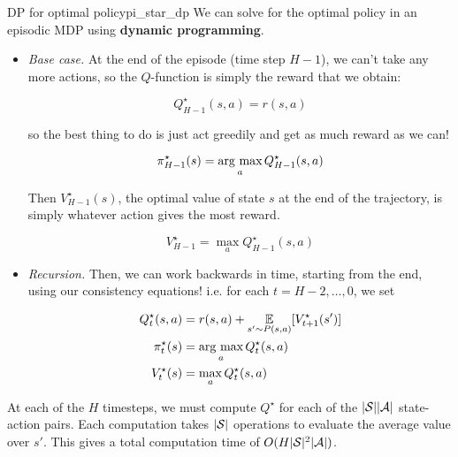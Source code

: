 \documentclass[../main/main]{subfiles}
\begin{document}
\begin{definition}{DP for optimal policy}{pi_star_dp}
    We can solve for the optimal policy in an episodic MDP using \textbf{dynamic programming}.
    
    \begin{itemize}
    \item \emph{Base case.} At the end of the episode (time step $H-1$),
        we can't take any more actions, so the $Q$-function is simply the reward
        that we obtain:
    
        \[
            Q^\star_{H-1}(s, a) = r(s, a)
        \]
    
        so the best thing to do is just act greedily
        and get as much reward as we can!
    
        \[
            \pi^\star_{H-1}(s) = \argmax_a Q^\star_{H-1}(s, a)
        \]
    
        Then $V^\star_{H-1}(s)$, the optimal value of state $s$ at the end of the
        trajectory, is simply whatever action gives the most reward.
    
        \[
            V^\star_{H-1} = \max_a Q^\star_{H-1}(s, a)
        \]
    
    \item \emph{Recursion.} Then, we can work backwards in time, starting from the
        end, using our consistency equations! i.e. for each $t = H-2, \dots, 0$, we set

        \begin{align*}
            Q^\star_{t}(s, a) &= r(s, a) + \E_{s' \sim P(s, a)} [V^\star_{t+1}(s')] \\
            \pi^\star_{t}(s) &= \argmax_a Q^\star_{t}(s, a) \\
            V^\star_{t}(s) &= \max_a Q^\star_{t}(s, a)
        \end{align*}
    \end{itemize}
    
    
    
    
    At each of the $H$ timesteps, we must compute $Q^{\star}$ for each of the $|\S| |\A|$ state-action pairs. Each computation takes $|\S|$ operations to evaluate the average value over $s'$. This gives a total computation time of $O(H |\S|^2 |\A|)$.
\end{definition}
\end{document}
